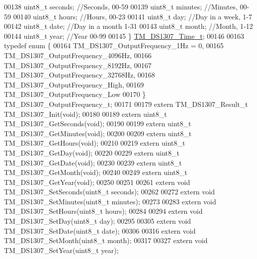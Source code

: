 \begin{DoxyCode}
00138     uint8\_t seconds;    \textcolor{comment}{//Seconds,          00-59}
00139     uint8\_t minutes;    \textcolor{comment}{//Minutes,          00-59}
00140     uint8\_t hours;      \textcolor{comment}{//Hours,            00-23}
00141     uint8\_t day;        \textcolor{comment}{//Day in a week,    1-7}
00142     uint8\_t date;       \textcolor{comment}{//Day in a month    1-31}
00143     uint8\_t month;      \textcolor{comment}{//Month,            1-12}
00144     uint8\_t year;       \textcolor{comment}{//Year              00-99}
00145 \} \hyperlink{struct_t_m___d_s1307___time__t}{TM\_DS1307\_Time\_t};
00146 
00163 \textcolor{keyword}{typedef} \textcolor{keyword}{enum} \{
00164     TM\_DS1307\_OutputFrequency\_1Hz = 0,
00165     TM\_DS1307\_OutputFrequency\_4096Hz,
00166     TM\_DS1307\_OutputFrequency\_8192Hz,
00167     TM\_DS1307\_OutputFrequency\_32768Hz,
00168     TM\_DS1307\_OutputFrequency\_High,
00169     TM\_DS1307\_OutputFrequency\_Low
00170 \} TM\_DS1307\_OutputFrequency\_t;
00171 
00179 \textcolor{keyword}{extern} TM\_DS1307\_Result\_t TM\_DS1307\_Init(\textcolor{keywordtype}{void});
00180 
00189 \textcolor{keyword}{extern} uint8\_t TM\_DS1307\_GetSeconds(\textcolor{keywordtype}{void});
00190 
00199 \textcolor{keyword}{extern} uint8\_t TM\_DS1307\_GetMinutes(\textcolor{keywordtype}{void});
00200 
00209 \textcolor{keyword}{extern} uint8\_t TM\_DS1307\_GetHours(\textcolor{keywordtype}{void});
00210 
00219 \textcolor{keyword}{extern} uint8\_t TM\_DS1307\_GetDay(\textcolor{keywordtype}{void});
00220 
00229 \textcolor{keyword}{extern} uint8\_t TM\_DS1307\_GetDate(\textcolor{keywordtype}{void});
00230 
00239 \textcolor{keyword}{extern} uint8\_t TM\_DS1307\_GetMonth(\textcolor{keywordtype}{void});
00240 
00249 \textcolor{keyword}{extern} uint8\_t TM\_DS1307\_GetYear(\textcolor{keywordtype}{void});
00250 
00251 
00261 \textcolor{keyword}{extern} \textcolor{keywordtype}{void} TM\_DS1307\_SetSeconds(uint8\_t seconds);
00262 
00272 \textcolor{keyword}{extern} \textcolor{keywordtype}{void} TM\_DS1307\_SetMinutes(uint8\_t minutes);
00273 
00283 \textcolor{keyword}{extern} \textcolor{keywordtype}{void} TM\_DS1307\_SetHours(uint8\_t hours);
00284 
00294 \textcolor{keyword}{extern} \textcolor{keywordtype}{void} TM\_DS1307\_SetDay(uint8\_t day);
00295 
00305 \textcolor{keyword}{extern} \textcolor{keywordtype}{void} TM\_DS1307\_SetDate(uint8\_t date);
00306 
00316 \textcolor{keyword}{extern} \textcolor{keywordtype}{void} TM\_DS1307\_SetMonth(uint8\_t month);
00317 
00327 \textcolor{keyword}{extern} \textcolor{keywordtype}{void} TM\_DS1307\_SetYear(uint8\_t year);

\end{DoxyCode}
